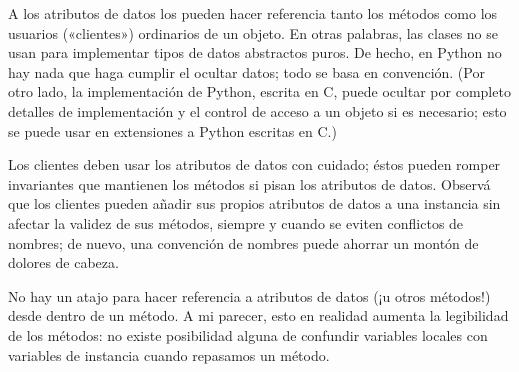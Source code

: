 \documentclass[a5paper,10pt,spanish]{sphinxmanual}
\begin{document}
\begin{sphinxVerbatim}[commandchars=\\\{\}]
 

  
 
  
  
 
\end{sphinxVerbatim}

\sphinxAtStartPar
A los atributos de datos los pueden hacer referencia tanto los métodos como los usuarios («clientes») ordinarios de un objeto.  En otras palabras, las clases no se usan para implementar tipos de datos abstractos puros.  De hecho, en Python no hay nada que haga cumplir el ocultar datos; todo se basa en convención.  (Por otro lado, la implementación de Python, escrita en C, puede ocultar por completo detalles de implementación y el control de acceso a un objeto si es necesario; esto se puede usar en extensiones a Python escritas en C.)

\sphinxAtStartPar
Los clientes deben usar los atributos de datos con cuidado; éstos pueden romper invariantes que mantienen los métodos si pisan los atributos de datos. Observá que los clientes pueden añadir sus propios atributos de datos a una instancia sin afectar la validez de sus métodos, siempre y cuando se eviten conflictos de nombres; de nuevo, una convención de nombres puede ahorrar un montón de dolores de cabeza.

\sphinxAtStartPar
No hay un atajo para hacer referencia a atributos de datos (¡u otros métodos!) desde dentro de un método.  A mi parecer, esto en realidad aumenta la legibilidad de los métodos: no existe posibilidad alguna de confundir variables locales con variables de instancia cuando repasamos un método.
\end{document}
